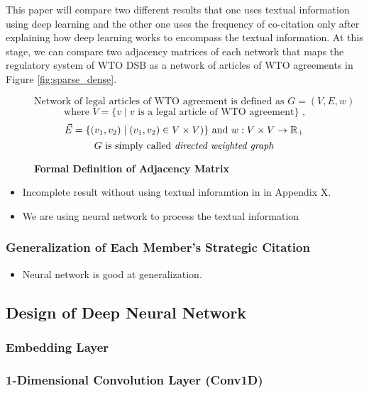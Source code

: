 \documentclass[12pt,letterpaper]{article}
\begin{document}
This paper will compare two different results that one uses textual information using deep learning and the other one
uses the frequency of co-citation only after explaining how deep learning works to encompass the textual information.
At this stage, we can compare two adjacency matrices of each network that maps the regulatory system of WTO DSB as a network of articles of WTO agreements in Figure \ref{fig:sparse_dense}.



\begin{figure}[ht]
  \[\text{Network of legal articles of WTO agreement is defined as }  G = (V, E, w) \] 
  \[\text{ where } V = \{v \mid v\text{ is a legal article of WTO agreement}\}  \text{ , } \]
  \[\vec{E} = \{(v_1, v_2) \mid (v_1, v_2)\in V \times V)\} \text{ and }w : V \times V \to \Bbb R_{+} \]
  \[G\text{ is simply called \textit{directed weighted graph}}\]
  \caption{\textbf{Formal Definition of Adjacency Matrix}}
  \label{fig:adj}
  \end{figure}

\begin{itemize}
  \item Incomplete result without using textual inforamtion in in Appendix X.
  \item We are using neural network to process the textual information
\end{itemize}

\subsubsection{Generalization of Each Member's Strategic Citation}
\begin{itemize}
  \item Neural network is good at generalization.
\end{itemize}


\subsection{Design of Deep Neural Network}
\subsubsection{Embedding Layer}


\subsubsection{1-Dimensional Convolution Layer (Conv1D)}

\end{document}
